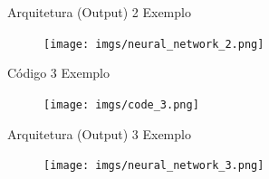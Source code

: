 \documentclass[2pt]{beamer} %
\begin{document}





\begin{frame}{Arquitetura (Output) 2 Exemplo}


\begin{figure}
    \centering
    \texttt{[image: imgs/neural\_network\_2.png]}
\end{figure}

\end{frame}


\begin{frame}{Código 3 Exemplo}


\begin{figure}
    \centering
    \texttt{[image: imgs/code\_3.png]}
\end{figure}

\end{frame}


\begin{frame}{Arquitetura (Output) 3 Exemplo}


\begin{figure}
    \centering
    \texttt{[image: imgs/neural\_network\_3.png]}
\end{figure}

\end{frame}

\end{document}
